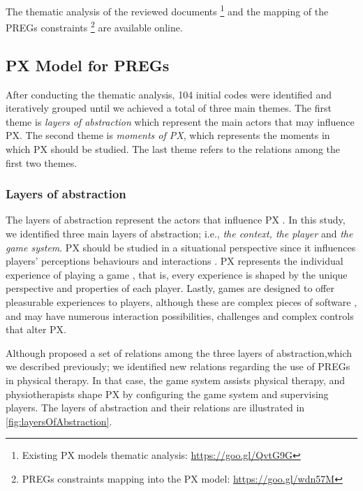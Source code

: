 The thematic analysis of the reviewed documents \footnote{Existing PX models thematic analysis: \url{https://goo.gl/QvtG9G}} and the mapping of the \acp{PREG} constraints \footnote{PREGs constraints mapping into the PX model: \url{https://goo.gl/wdn57M}} are available online.

\subsection{PX Model for PREGs} %
\label{sec:findings_model}
After conducting the thematic analysis, 104 initial codes were identified and iteratively grouped until we achieved a total of three main themes. The first theme is \textit{layers of abstraction} which represent the main actors that may influence \ac{PX}. The second theme is \textit{moments of \ac{PX}}, which represents the moments in which \ac{PX} should be studied. The last theme refers to the relations among the first two themes.

\subsubsection{Layers of abstraction}
\label{sec:layers_abstraction}
The layers of abstraction represent the actors that influence \ac{PX} \autocite{Nacked,Nackea2,Engl2013,Elson2014}. In this study, we identified three main layers of abstraction; i.e., \textit{the context, the player} and \textit{the game system}. \ac{PX} should be studied in a situational perspective \autocite{Nacked,DeKort2007b} since it influences players' perceptions \autocite{Elson2014} behaviours and interactions \autocite{Engl2013,DeKort2007b}. \ac{PX} represents the individual experience of playing a game \autocite{Engl2013,Nackea2}, that is, every experience is shaped by the unique perspective \autocite{Fernandez2008} and properties \autocite{Nacked} of each player. Lastly, games are designed to offer pleasurable experiences to players, although these are complex pieces of software \autocite{Nackea}, and may have numerous interaction possibilities, challenges and complex controls \autocite{Nacked} that alter \ac{PX}.

Although \textcite{Nackea2} proposed a set of relations among the three layers of abstraction,which we described previously; we identified new relations regarding the use of \acp{PREG} in physical therapy. In that case, the game system assists physical therapy, and physiotherapists shape \ac{PX} by configuring the game system and supervising players. The layers of abstraction and their relations are illustrated in \autoref{fig:layersOfAbstraction}.

